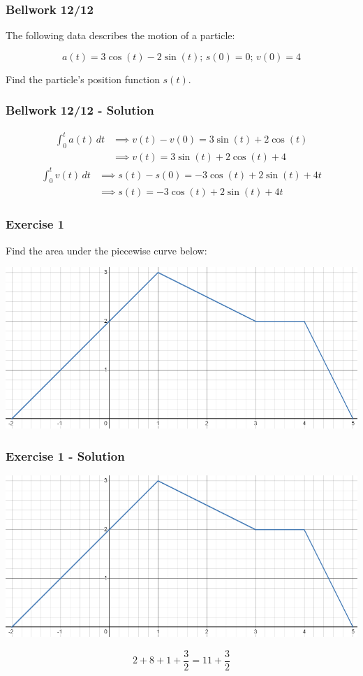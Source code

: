 \documentclass[12pt]{beamer}
\begin{document}
\begin{frame}
	\frametitle{Bellwork 12/12}
	\initclock

	\vfill
	\large
	The following data describes the motion of a particle:
	\begin{center}
		\[a(t)=3\cos(t)-2\sin(t)\text{; }s(0)=0\text{; }v(0)=4\]
	\end{center}
	\vfill
	\vfill
	Find the particle's position function $s(t)$.
	\vfill
	\vfill
	\vfill
	\vfill

	\small
	\crono
\end{frame}
\begin{frame}
	\frametitle{Bellwork 12/12 - Solution}

	\small
	\begin{align*}
		\int_{0}^{t}a(t)\,dt & \implies v(t)-v(0)=3\sin(t)+2\cos(t) \\
		& \implies v(t)=3\sin(t)+2\cos(t)+4
	\end{align*}
	\begin{align*}
		\int_{0}^{t}v(t)\,dt & \implies s(t)-s(0)=-3\cos(t)+2\sin(t)+4t \\
		& \implies \boxed{s(t)=-3\cos(t)+2\sin(t)+4t}
	\end{align*}
\end{frame}
\begin{frame}
	\frametitle{Exercise 1}

	\large
	Find the area under the piecewise curve below:
	\vfill
	\begin{center}
		\includegraphics[scale=0.45]{exercise_1_graph.png}
	\end{center}
\end{frame}
\begin{frame}
	\frametitle{Exercise 1 - Solution}

	\large
	\begin{center}
		\includegraphics[scale=0.45]{exercise_1_graph.png} %
	\end{center}
	\vfill
	\[2+8+1+\frac{3}{2}=\boxed{11+\frac{3}{2}}\]
\end{frame}
\end{document}
